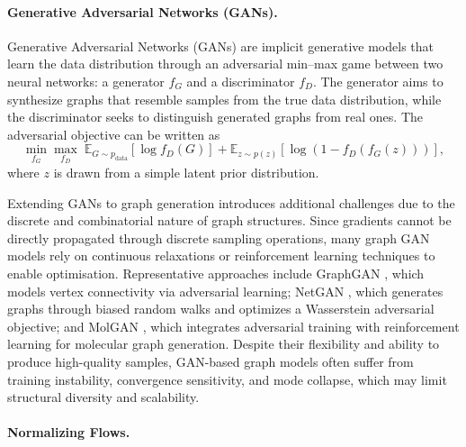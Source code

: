 \paragraph{Generative Adversarial Networks (GANs).}

Generative Adversarial Networks (GANs) are implicit generative
models that learn the data distribution through an adversarial
min--max game between two neural networks: a generator
$f_G$ and a discriminator $f_D$.
The generator aims to synthesize graphs that resemble samples
from the true data distribution, while the discriminator seeks
to distinguish generated graphs from real ones.
The adversarial objective can be written as
\[
\min_{f_G} \max_{f_D}
\;
\mathbb{E}_{G \sim p_{\text{data}}}
[\log f_D(G)]
+
\mathbb{E}_{z \sim p(z)}
[\log (1 - f_D(f_G(z)))] ,
\]
where $z$ is drawn from a simple latent prior distribution.

Extending GANs to graph generation introduces additional
challenges due to the discrete and combinatorial nature of
graph structures.
Since gradients cannot be directly propagated through discrete
sampling operations, many graph GAN models rely on
continuous relaxations or reinforcement learning techniques
to enable optimisation.
Representative approaches include GraphGAN
\citep{wang2018graphgan}, which models vertex connectivity
via adversarial learning; NetGAN \citep{bojchevski2018netgan},
which generates graphs through biased random walks and
optimizes a Wasserstein adversarial objective; and MolGAN
\citep{de2018molgan}, which integrates adversarial training
with reinforcement learning for molecular graph generation.
Despite their flexibility and ability to produce high-quality
samples, GAN-based graph models often suffer from
training instability, convergence sensitivity, and mode collapse,
which may limit structural diversity and scalability.

\paragraph{Normalizing Flows.}

